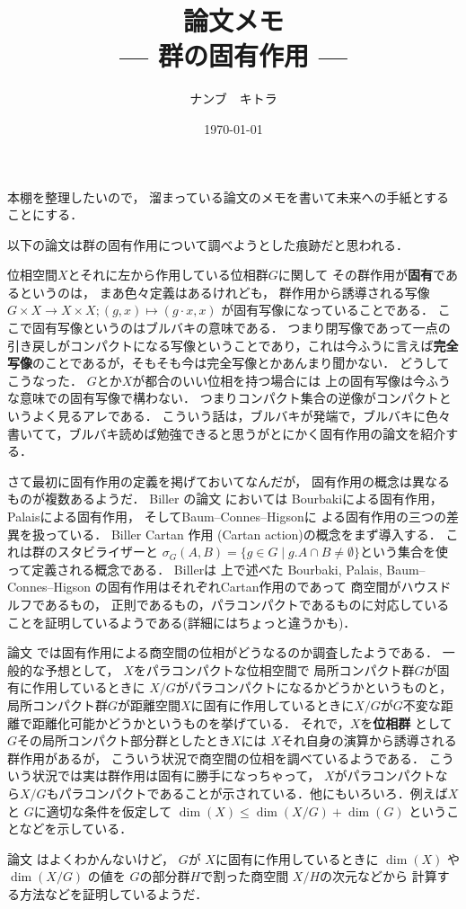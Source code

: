 \documentclass[leqno, a4paper, 12pt]{jsarticle}
\title{論文メモ
\large{\\--- 群の固有作用 ---}
}
\author{ナンブ　キトラ}
\date{\today}
\begin{document}
\maketitle

本棚を整理したいので，
溜まっている論文のメモを書いて未来への手紙とすることにする．

以下の論文は群の固有作用について調べようとした痕跡だと思われる．

位相空間$X$とそれに左から作用している位相群$G$に関して
その群作用が\textbf{固有}であるというのは，
まあ色々定義はあるけれども，
群作用から誘導される写像
$G\times X\to X\times X; (g, x)\mapsto (g\cdot x, x)$
が固有写像になっていることである．
ここで固有写像というのはブルバキの意味である．
つまり閉写像であって一点の引き戻しがコンパクトになる写像ということであり，これは今ふうに言えば\textbf{完全写像}のことであるが，そもそも今は完全写像とかあんまり聞かない．
どうしてこうなった．
$G$とか$X$が都合のいい位相を持つ場合には
上の固有写像は今ふうな意味での固有写像で構わない．
つまりコンパクト集合の逆像がコンパクトというよく見るアレである．
こういう話は，ブルバキが発端で，ブルバキに色々書いてて，ブルバキ読めば勉強できると思うがとにかく固有作用の論文を紹介する．


さて最初に固有作用の定義を掲げておいてなんだが，
固有作用の概念は異なるものが複数あるようだ．
Biller の論文
\cite{MR2040583}においては
Bourbakiによる固有作用，
Palaisによる固有作用，
そしてBaum--Connes--Higsonに
よる固有作用の三つの差異を扱っている．
Biller Cartan 作用
(Cartan action)の概念をまず導入する．
これは群のスタビライザーと
$\sigma_{G}(A, B)=\{g\in G\mid g.A\cap B \neq \emptyset \}$という集合を使って定義される概念である．
Billerは
上で述べた
Bourbaki, 
Palais, 
Baum--Connes--Higson
の固有作用はそれぞれCartan作用のであって
商空間がハウスドルフであるもの，
正則であるもの，パラコンパクトであるものに対応していることを証明しているようである(詳細にはちょっと違うかも)．



論文
\cite{MR2661569}
では固有作用による商空間の位相がどうなるのか調査したようである．
一般的な予想として，
$X$をパラコンパクトな位相空間で
局所コンパクト群$G$が固有に作用しているときに
$X/G$がパラコンパクトになるかどうかというものと，
局所コンパクト群$G$が距離空間$X$に固有に作用しているときに$X/G$が$G$不変な距離で距離化可能かどうかというものを挙げている．
それで，$X$を\textbf{位相群}
として$G$その局所コンパクト部分群としたとき$X$には
$X$それ自身の演算から誘導される群作用があるが，
こういう状況で商空間の位相を調べているようである．
こういう状況では実は群作用は固有に勝手になっちゃって，
$X$がパラコンパクトなら$X/G$もパラコンパクトであることが示されている．他にもいろいろ．例えば$X$と
$G$に適切な条件を仮定して
$\dim(X)\le \dim(X/G)+\dim(G)$
ということなどを示している．

論文
\cite{MR2825345}
はよくわかんないけど，
$G$が
$X$に固有に作用しているときに
$\dim(X)$
や
$\dim(X/G)$
の値を
$G$の部分群$H$で割った商空間
$X/H$の次元などから
計算する方法などを証明しているようだ．

\nocite{*}


\end{document}
